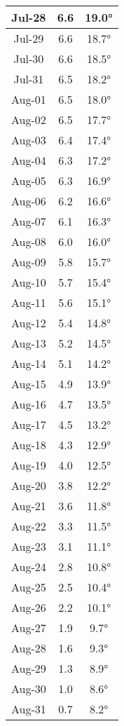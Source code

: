 \begin{footnotesize}
\begin{minipage}{0.33\textwidth}
\begin{tabular}[t]{c | c | c}
Jul-28 & 6.6 & 19.0°\\\hline
Jul-29 & 6.6 & 18.7°\\\hline
Jul-30 & 6.6 & 18.5°\\\hline
Jul-31 & 6.5 & 18.2°\\\hline
Aug-01 & 6.5 & 18.0°\\\hline
Aug-02 & 6.5 & 17.7°\\\hline
Aug-03 & 6.4 & 17.4°\\\hline
Aug-04 & 6.3 & 17.2°\\\hline
Aug-05 & 6.3 & 16.9°\\\hline
Aug-06 & 6.2 & 16.6°\\\hline
Aug-07 & 6.1 & 16.3°\\\hline
Aug-08 & 6.0 & 16.0°\\\hline
Aug-09 & 5.8 & 15.7°\\\hline
Aug-10 & 5.7 & 15.4°\\\hline
Aug-11 & 5.6 & 15.1°\\\hline
Aug-12 & 5.4 & 14.8°\\\hline
Aug-13 & 5.2 & 14.5°\\\hline
Aug-14 & 5.1 & 14.2°\\\hline
Aug-15 & 4.9 & 13.9°\\\hline
Aug-16 & 4.7 & 13.5°\\\hline
Aug-17 & 4.5 & 13.2°\\\hline
Aug-18 & 4.3 & 12.9°\\\hline
Aug-19 & 4.0 & 12.5°\\\hline
Aug-20 & 3.8 & 12.2°\\\hline
Aug-21 & 3.6 & 11.8°\\\hline
Aug-22 & 3.3 & 11.5°\\\hline
Aug-23 & 3.1 & 11.1°\\\hline
Aug-24 & 2.8 & 10.8°\\\hline
Aug-25 & 2.5 & 10.4°\\\hline
Aug-26 & 2.2 & 10.1°\\\hline
Aug-27 & 1.9 & 9.7°\\\hline
Aug-28 & 1.6 & 9.3°\\\hline
Aug-29 & 1.3 & 8.9°\\\hline
Aug-30 & 1.0 & 8.6°\\\hline
Aug-31 & 0.7 & 8.2°\\\hline
\end{tabular}\end{minipage}
\begin{minipage}{0.33\textwidth}
\begin{tabular}[t]{c | c | c}

\end{tabular}
\end{minipage}
\end{footnotesize}
